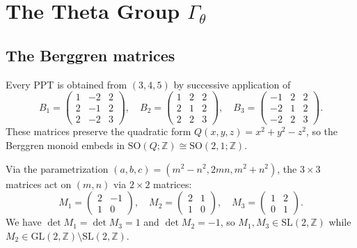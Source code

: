 \documentclass[12pt]{amsart}
\theoremstyle{definition}
\theoremstyle{remark}
\newcommand{\SL}{\mathrm{SL}}
\newcommand{\GL}{\mathrm{GL}}
\newcommand{\SO}{\mathrm{SO}}
\newcommand{\Z}{\mathbb{Z}}
\newcommand{\Gtheta}{\Gamma_\theta}
\begin{document}
\section{The Theta Group $\Gtheta$}\label{sec:theta}

\subsection{The Berggren matrices}

Every PPT is obtained from $(3,4,5)$ by successive application of
\begin{equation}\label{eq:berggren3x3}
B_1 = \begin{pmatrix} 1&-2&2\\2&-1&2\\2&-2&3\end{pmatrix},\quad
B_2 = \begin{pmatrix} 1&2&2\\2&1&2\\2&2&3\end{pmatrix},\quad
B_3 = \begin{pmatrix} -1&2&2\\-2&1&2\\-2&2&3\end{pmatrix}.
\end{equation}
These matrices preserve the quadratic form $Q(x,y,z) = x^2 + y^2 - z^2$,
so the Berggren monoid embeds in $\SO(Q;\Z) \cong \SO(2,1;\Z)$.

Via the parametrization $(a,b,c) = (m^2-n^2, 2mn, m^2+n^2)$, the
$3\times 3$ matrices act on $(m,n)$ via $2\times 2$ matrices:
\begin{equation}\label{eq:berggren2x2}
M_1 = \begin{pmatrix}2&-1\\1&0\end{pmatrix},\quad
M_2 = \begin{pmatrix}2&1\\1&0\end{pmatrix},\quad
M_3 = \begin{pmatrix}1&2\\0&1\end{pmatrix}.
\end{equation}
We have $\det M_1 = \det M_3 = 1$ and $\det M_2 = -1$, so $M_1, M_3 \in
\SL(2,\Z)$ while $M_2 \in \GL(2,\Z) \setminus \SL(2,\Z)$.
\end{document}

